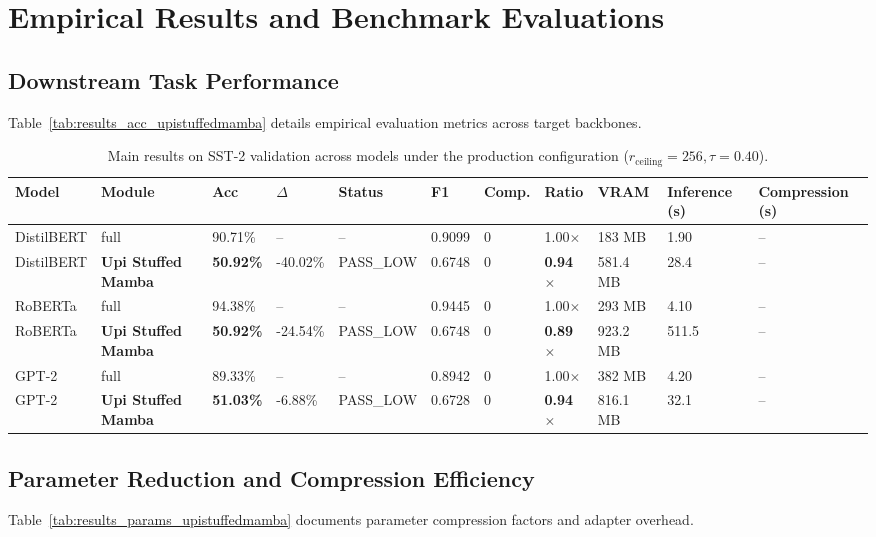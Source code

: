\section{Empirical Results and Benchmark Evaluations}

\subsection{Downstream Task Performance}
Table~\ref{tab:results_acc_upistuffedmamba} details empirical evaluation metrics across target backbones.

\begin{table}[t]
\centering
\small
\begin{tabular}{lllllllllll}
\toprule
\textbf{Model} & \textbf{Module} & \textbf{Acc} & \textbf{$\Delta$} & \textbf{Status} & \textbf{F1} & \textbf{Comp.} & \textbf{Ratio} & \textbf{VRAM} & \textbf{Inference (s)} & \textbf{Compression (s)} \\
\midrule
DistilBERT & full & 90.71\% & -- & -- & 0.9099 & 0 & 1.00$\times$ & 183 MB & 1.90 & -- \\
DistilBERT & \textbf{Upi Stuffed Mamba} & \textbf{50.92\%} & -40.02\% & PASS_LOW & 0.6748 & 0 & \textbf{0.94$\times$} & 581.4 MB & 28.4 & -- \\
RoBERTa & full & 94.38\% & -- & -- & 0.9445 & 0 & 1.00$\times$ & 293 MB & 4.10 & -- \\
RoBERTa & \textbf{Upi Stuffed Mamba} & \textbf{50.92\%} & -24.54\% & PASS_LOW & 0.6748 & 0 & \textbf{0.89$\times$} & 923.2 MB & 511.5 & -- \\
GPT-2 & full & 89.33\% & -- & -- & 0.8942 & 0 & 1.00$\times$ & 382 MB & 4.20 & -- \\
GPT-2 & \textbf{Upi Stuffed Mamba} & \textbf{51.03\%} & -6.88\% & PASS_LOW & 0.6728 & 0 & \textbf{0.94$\times$} & 816.1 MB & 32.1 & -- \\
\bottomrule
\end{tabular}
\caption{Main results on SST-2 validation across models under the production configuration ($r_{\mathrm{ceiling}}=256, \tau=0.40$).}
\label{tab:main_sst2}
\end{table}

\subsection{Parameter Reduction and Compression Efficiency}
Table~\ref{tab:results_params_upistuffedmamba} documents parameter compression factors and adapter overhead.

